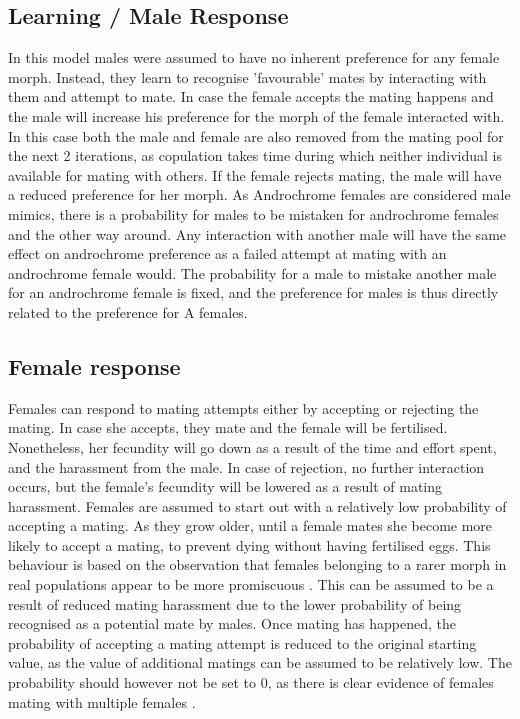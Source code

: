 \documentclass{article}
\begin{document}
\subsection{Learning / Male Response}
In this model males were assumed to have no inherent preference for any female morph. Instead, they learn to recognise 'favourable' mates by interacting with them and attempt to mate. In case the female accepts the mating happens and the male will increase his preference for the morph of the female interacted with. In this case both the male and female are also removed from the mating pool for the next 2 iterations, as copulation takes time during which neither individual is available for mating with others. If the female rejects mating, the male will have a reduced preference for her morph. As Androchrome females are considered male mimics, there is a probability for males to be mistaken for androchrome females and the other way around. Any interaction with another male will have the same effect on androchrome preference as a failed attempt at mating with an androchrome female would. The probability for a male to mistake another male for an androchrome female is fixed, and the preference for males is thus directly related to the preference for A females.

\subsection{Female response}
Females can respond to mating attempts either by accepting or rejecting the mating. In case she accepts, they mate and the female will be fertilised. Nonetheless, her fecundity will go down as a result of the time and effort spent, and the harassment from the male. In case of rejection, no further interaction occurs, but the female's fecundity will be lowered as a result of mating harassment. Females are assumed to start out with a relatively low probability of accepting a mating. As they grow older, until a female mates she become more likely to accept a mating, to prevent dying without having fertilised eggs. This behaviour is based on the observation that females belonging to a rarer morph in real populations appear to be more promiscuous \cite{Citation Needed}. This can be assumed to be a result of reduced mating harassment due to the lower probability of being recognised as a potential mate by males. Once mating has happened, the probability of accepting a mating attempt is reduced to the original starting value, as the value of additional matings can be assumed to be relatively low. The probability should however not be set to 0, as there is clear evidence of females mating with multiple females \cite{Cooper1996}.
\end{document}
